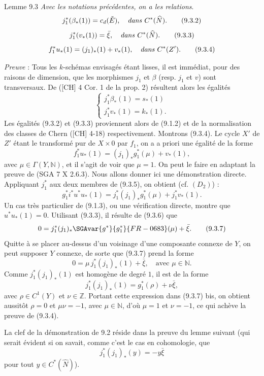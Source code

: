 \begin{statement}{Lemme 9.3}
\emph{Avec les notations précédentes, on a les relations}.
\[
j_1^*(\beta_*(1))=c_d(\check E),\quad\text{\emph{dans} }C^*(\widehat N).
\tag{9.3.2}
\]
\[
j_1^*(v_*(1))=\bar\xi,\quad\text{\emph{dans} }C^*(\widehat N).
\tag{9.3.3}
\]
\[
f_1^*u_*(1)=(j_1)_*(1)+v_*(1),\quad\text{\emph{dans} }C^*(Z').
\tag{9.3.4}
\]
\end{statement}

\emph{Preuve} : Tous les $k$-schémas envisagés étant lisses, il est immédiat, pour des raisons de dimension, que les morphismes $j_1$ et $\beta$ (resp. $j_1$ et $v$) sont transversaux. De ([CH] 4 Cor. 1 de la prop. 2) résultent alors les égalités
\[
\begin{cases}
j_1^*\beta_*(1)=s_*(1)\\
j_1^*v_*(1)=k_*(1).
\end{cases}
\]
Les égalités (9.3.2) et (9.3.3) proviennent alors de (9.1.2) et de la normalisation des classes de Chern ([CH] 4-18) respectivement. Montrons (9.3.4). Le cycle $X'$ de $Z'$ étant le transformé pur de $X\times0$ par $f_1$, on a a priori une égalité de la forme
\[
f_1^*u_*(1)=(j_1)_*g_1^*(\mu)+v_*(1),
\tag{9.3.5}
\]
avec $\mu\in\Gamma(Y,\mathbb{N})$, et il s'agit de voir que $\mu=1$. On peut le faire en adaptant la preuve de (SGA 7 X 2.6.3). Nous allons donner ici une démonstration directe. Appliquant $j_1^*$ aux deux membres de (9.3.5), on obtient (cf. $(D_2)$) :
\[
g_1^*i^*u^*u_*(1)=j_1^*(j_1)_*g_1^*(\mu)+j_1^*v_*(1).
\tag{9.3.6}
\]
Un cas très particulier de (9.1.3), ou une vérification directe, montre que $u^*u_*(1)=0$. Utilisant (9.3.3), il résulte de (9.3.6) que
\[
0=j_1^*(j_1)_*\SGAvar{g^*}{g_1^*}{FR-0683}(\mu)+\bar\xi.
\tag{9.3.7}
\]
Quitte à se placer au-dessus d'un voisinage d'une composante connexe de $Y$, on peut supposer $Y$ connexe, de sorte que (9.3.7) prend la forme
\[
0=\mu\,j_1^*(j_1)_*(1)+\bar\xi,\quad\text{avec }\mu\in\mathbb{N}.
\tag*{(9.3.7) bis}
\]
Comme $j_1^*(j_1)_*(1)$ est homogène de degré $1$, il est de la forme
\[
j_1^*(j_1)_*(1)=g_1^*(\rho)+\nu\bar\xi,
\]
avec $\rho\in C^1(Y)$ et $\nu\in\mathbb{Z}$. Portant cette expression dans (9.3.7) bis, on obtient aussitôt $\rho=0$ et $\mu\nu=-1$, avec $\mu\in\mathbb{N}$, d'où $\mu=1$ et $\nu=-1$, ce qui achève la preuve de (9.3.4).

La clef de la démonstration de 9.2 réside dans la preuve du lemme suivant (qui serait évident si on savait, comme c'est le cas en cohomologie, que
\[
j_1^*(j_1)_*(y)=-y\bar\xi
\]
pour tout $y\in C^*(\widehat N)$).

